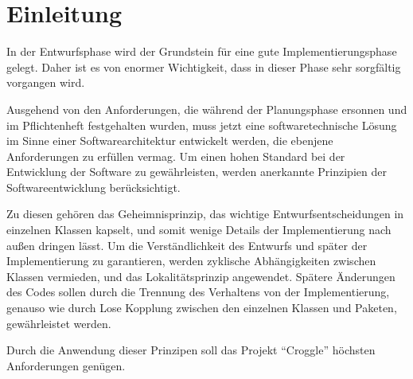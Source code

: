 \section{Einleitung}

In der Entwurfsphase wird der Grundstein für eine gute Implementierungsphase gelegt.
Daher ist es von enormer Wichtigkeit, dass in dieser Phase sehr sorgfältig vorgangen wird.

Ausgehend von den Anforderungen, die während der Planungsphase ersonnen und im Pflichtenheft festgehalten wurden, muss jetzt eine softwaretechnische Lösung im Sinne einer Softwarearchitektur entwickelt werden, die ebenjene Anforderungen zu erfüllen vermag.
Um einen hohen Standard bei der Entwicklung der Software zu gewährleisten, werden anerkannte Prinzipien der Softwareentwicklung berücksichtigt.

Zu diesen gehören das Geheimnisprinzip, das wichtige Entwurfsentscheidungen in einzelnen Klassen kapselt, und somit wenige Details der Implementierung nach außen dringen lässt.
Um die Verständlichkeit des Entwurfs und später der Implementierung zu garantieren, werden zyklische Abhängigkeiten zwischen Klassen vermieden, und das Lokalitätsprinzip angewendet.
Spätere Änderungen des Codes sollen durch die Trennung des Verhaltens von der Implementierung, genauso wie durch Lose Kopplung zwischen den einzelnen Klassen und Paketen, gewährleistet werden.

Durch die Anwendung dieser Prinzipen soll das Projekt "`Croggle"' höchsten Anforderungen genügen.

